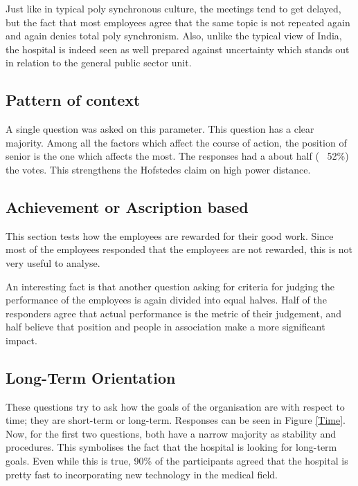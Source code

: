 \documentclass{article}
\begin{document}
Just like in typical poly synchronous culture, the meetings tend to get delayed, but the fact that most employees agree that the same topic is not repeated again and again denies total poly synchronism. Also, unlike the typical view of India, the hospital is indeed seen as well prepared against uncertainty which stands out in relation to the general public sector unit.

\subsection{Pattern of context}

A single question was asked on this parameter. This question has a clear majority. Among all the factors which affect the course of action, the position of senior is the one which affects the most. The responses had a about half (~ 52\%) the votes. This strengthens the Hofstedes claim on high power distance.

\subsection{Achievement or Ascription based}

This section tests how the employees are rewarded for their good work. Since most of the employees responded that the employees are not rewarded, this is not very useful to analyse.

An interesting fact is that another question asking for criteria for judging the performance of the employees is again divided into equal halves. Half of the responders agree that actual performance is the metric of their judgement, and half believe that position and people in association make a more significant impact.

\subsection{Long-Term Orientation}

These questions try to ask how the goals of the organisation are with respect to time; they are short-term or long-term. Responses can be seen in Figure \ref{Time}. Now, for the first two questions, both have a narrow majority as stability and procedures. This symbolises the fact that the hospital is looking for long-term goals. Even while this is true, 90\% of the participants agreed that the hospital is pretty fast to incorporating new technology in the medical field.
\end{document}
